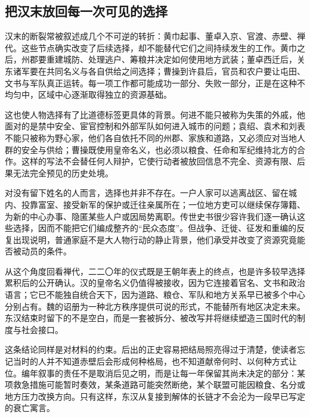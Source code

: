 \subsection{把汉末放回每一次可见的选择}

汉末的断裂常被叙述成几个不可逆的转折：黄巾起事、董卓入京、官渡、赤壁、禅代。这些节点确实改变了后续选择，却不能替代它们之间持续发生的工作。黄巾之后，州郡要重建城防、处理逃户、筹粮并决定如何使用地方武装；董卓西迁后，关东诸军要在共同名义与各自供给之间选择；曹操到许县后，官员和农户要让屯田、文书与军队真正运转。每一项工作都可能成功一部分、失败一部分，正是在这种不均匀中，区域中心逐渐取得独立的资源基础。

这也使人物选择有了比道德标签更具体的背景。何进不能只被称为失策的外戚，他面对的是禁中安全、宦官控制和外部军队如何进入城市的问题；袁绍、袁术和刘表不能只被称为野心家，他们各自依托不同的州郡、家族和道路，又必须应对当地人群的安全与供给；曹操既使用皇帝名义，也必须以粮食、任命和军纪维持北方的合作。这样的写法不会替任何人辩护，它使行动者被放回信息不完全、资源有限、后果无法完全预见的历史处境。

对没有留下姓名的人而言，选择也并非不存在。一户人家可以逃离战区、留在城内、投靠富室、接受新军的保护或迁往亲属所在；一位地方吏可以继续保存簿籍、为新的中心办事、隐匿某些人户或因局势离职。传世史书很少容许我们逐一确认这些选择，因而不能把它们编成整齐的“民众态度”。但战争、迁徙、征发和重编的反复出现说明，普通家庭不是大人物行动的静止背景，他们承受并改变了资源究竟能否被动员的条件。

从这个角度回看禅代，二二〇年的仪式既是王朝年表上的终点，也是许多较早选择累积后的公开确认。汉的皇帝名义仍值得被接收，因为它连接着官名、文书和政治语言；它已不能独自统合天下，因为道路、粮仓、军队和地方关系早已被多个中心分别占有。魏的诏册为一种北方秩序提供可说的形式，不能替所有地区决定未来。东汉结束时留下的不是空白，而是一套被拆分、被改写并将继续塑造三国时代的制度与社会接口。

这条结论同样是对材料的约束。后出的正史容易把结局照亮得过于清楚，使读者忘记当时的人并不知道赤壁后会形成何种格局，也不知道献帝何时、以何种方式让位。编年叙事的责任不是取消后见之明，而是让每一年保留其尚未决定的部分：某项救急措施可能暂时奏效，某条道路可能突然断绝，某个联盟可能因粮食、名分或地方压力改换方向。只有这样，东汉从复接到解体的长链才不会沦为一段早已写定的衰亡寓言。
